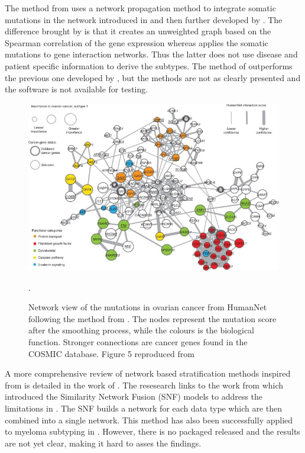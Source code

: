 The method from \citet{He2017-dj} uses a network propagation method to integrate somatic mutations in the network introduced in \citet{Vanunu2010-el} and then further developed by \citet{Hofree2013-ld}. The difference brought by \citet{He2017-dj} is that it creates an unweighted graph based on the Spearman correlation of the gene expression whereas \citet{Hofree2013-ld} applies the somatic mutations to gene interaction networks. Thus the latter does not use disease and patient specific information to derive the subtypes. The method of \citet{He2017-dj} outperforms the previous one developed by \citet{Hofree2013-ld}, but the methods are not as clearly presented and the software is not available for testing.

\begin{figure}[!b]
    \centering
    \includegraphics[width=1.0\textwidth,keepaspectratio]{Sections/Lit_review/Resources/hofree_fig_5.jpg}
    \caption[HumanNet: network of the mutations in ovarian cancer]{Network view of the mutations in ovarian cancer from HumanNet following the method from \citet{Hofree2013-ld}. The nodes represent the mutation score after the smoothing process, while the colours is the biological function. Stronger connections are cancer genes found in the COSMIC database. Figure 5 reproduced from \citet{Hofree2013-ld}}.
    \label{fig:lit:hofree}
\end{figure}



A more comprehensive review of network based stratification methods inspired from \citet{Hofree2013-ld, He2017-dj} is detailed in the work of \citet{Petti2023-qo}. The resesearch links to the work from \citet{Wang2014-wr} which introduced the Similarity Network Fusion (SNF) models to address the limitations in \citet{Hofree2013-ld}. The SNF builds a network for each data type which are then combined into a single network. This method has also been successfully applied to myeloma subtyping in \citet{Bhalla2021-uv}. However, there is no packaged released and the results are not yet clear, making it hard to asses the findings.

